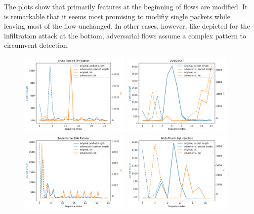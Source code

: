 \documentclass[sigconf,nonacm]{acmart}
\begin{document}
The plots show that primarily features at the beginning of flows are modified. It is remarkable that it seems most promising to modifiy single packets while leaving most of the flow unchanged. In other cases, however, like depicted for the infiltration attack at the bottom, adversarial flows assume a complex pattern to circumvent detection.

\begin{figure}[p]
\includegraphics[width=0.48\textwidth]{../plots/plot_adv/1.pdf}
\includegraphics[width=0.48\textwidth]{../plots/plot_adv/2.pdf}
\includegraphics[width=0.48\textwidth]{../plots/plot_adv/3.pdf}
\includegraphics[width=0.48\textwidth]{../plots/plot_adv/4.pdf}

\end{figure}
\end{document}
